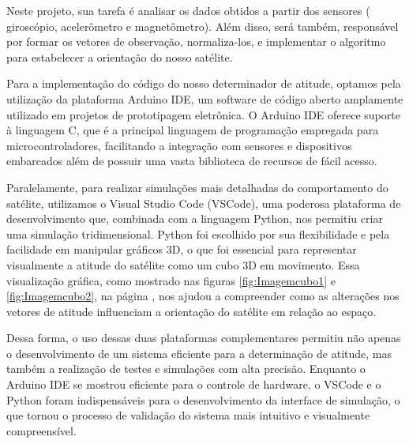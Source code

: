 \documentclass[
	12pt,				%
	openright,			%
	oneside,			%
	a4paper,			%
	english,			%
	brazil				%
	]{abntex2}
\begin{document}
Neste projeto, sua tarefa é analisar os dados obtidos a partir dos sensores ( giroscópio, acelerômetro e magnetômetro). Além disso, será também, responsável por formar os vetores de observação, normaliza-los, e implementar o algoritmo para estabelecer a orientação do nosso satélite.

Para a implementação do código do nosso determinador de atitude, optamos pela utilização da plataforma Arduino IDE, um software de código aberto amplamente utilizado em projetos de prototipagem eletrônica. O Arduino IDE oferece suporte à linguagem C, que é a principal linguagem de programação empregada para microcontroladores, facilitando a integração com sensores e dispositivos embarcados além de possuir uma vasta biblioteca de recursos de fácil acesso. 

Paralelamente, para realizar simulações mais detalhadas do comportamento do satélite, utilizamos o Visual Studio Code (VSCode), uma poderosa plataforma de desenvolvimento que, combinada com a linguagem Python, nos permitiu criar uma simulação tridimensional. Python foi escolhido por sua flexibilidade e pela facilidade em manipular gráficos 3D, o que foi essencial para representar visualmente a atitude do satélite como um cubo 3D em movimento. Essa visualização gráfica, como mostrado nas figuras \ref{fig:Imagemcubo1} e \ref{fig:Imagemcubo2}, na página \pageref{fig:Imagemcubo1}, nos ajudou a compreender como as alterações nos vetores de atitude influenciam a orientação do satélite em relação ao espaço.

Dessa forma, o uso dessas duas plataformas complementares permitiu não apenas o desenvolvimento de um sistema eficiente para a determinação de atitude, mas também a realização de testes e simulações com alta precisão. Enquanto o Arduino IDE se mostrou eficiente para o controle de hardware, o VSCode e o Python foram indispensáveis para o desenvolvimento da interface de simulação, o que tornou o processo de validação do sistema mais intuitivo e visualmente compreensível.




\end{document}
